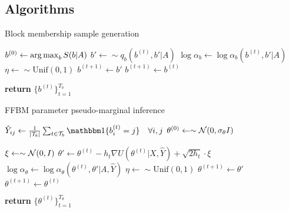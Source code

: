 \subsection{Algorithms}

\begin{algorithm} %
	\caption{Block membership sample generation} %
	\label{alg:b-samples} %
	\begin{algorithmic} %
		\STATE $b^{(0)} \gets \operatorname*{arg\,max}_b S(b|A)$
		\STATE $b' \gets \sim q_b(b^{(t)}, b' | A)$
		\STATE $\log \alpha_b \gets \log \alpha_b(b^{(t)}, b' | A)$
		\STATE $\eta \gets \sim \textrm{Unif}(0,1)$
		\STATE $b^{(t+1)} \gets b'$
		\ELSE
		\STATE $b^{(t+1)} \gets b^{(t)}$
		\ENDIF
		\ENDFOR
		
		\STATE \textbf{return} $\{b^{(t)}\}_{t=1}^{T_b}$
		
	\end{algorithmic}
\end{algorithm}

\begin{algorithm} %
	\caption{FFBM parameter pseudo-marginal inference} %
	\label{alg:theta-samples} %
	\begin{algorithmic} %
		
		\STATE $\hat{Y}_{ij} \gets \frac{1}{|\Tcal_b|} \sum_{t \in \Tcal_b} \one \{ b^{(t)}_i = j\} \quad \forall i,j$
		\STATE $\theta^{(0)} \gets \sim \mathcal{N}(0, \sigma_\theta I)$
		
		\item[]
		
		\STATE $\xi \gets \sim \mathcal{N}(0, I)$
		\STATE $\theta' \gets \theta^{(t)} - h_t \nabla U(\theta^{(t)} | X, \hat{Y}) + \sqrt{2h_t} \cdot \xi$
		\STATE $\log \alpha_\theta \gets \log \alpha_\theta(\theta^{(t)}, \theta' | A, \hat{Y})$
		\STATE $\eta \gets \sim \textrm{Unif}(0,1)$
		\IF{$\log \eta < \log \alpha_\theta$}
		\STATE $\theta^{(t+1)} \gets \theta'$
		\ELSE
		\STATE $\theta^{(t+1)} \gets \theta^{(t)}$
		\ENDIF
		\ENDFOR
		
		\STATE \textbf{return} $\{\theta^{(t)}\}_{t=1}^{T_\theta}$
		
	\end{algorithmic}
\end{algorithm}


